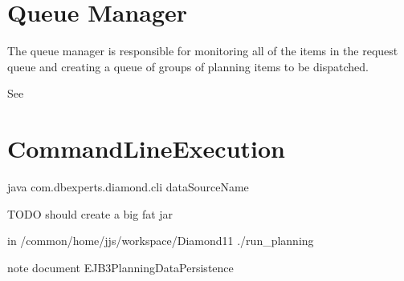 \section{Queue Manager}
The queue manager is responsible for monitoring all of the items in the request queue and creating a queue of
groups of planning items to be dispatched.

See
\section{CommandLineExecution}
java com.dbexperts.diamond.cli dataSourceName

TODO should create a big fat jar

in /common/home/jjs/workspace/Diamond11 ./run\_planning

note document EJB3PlanningDataPersistence